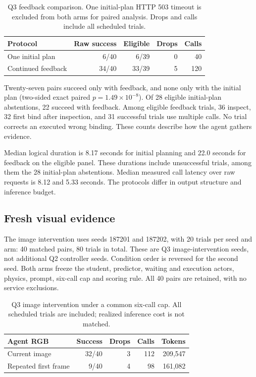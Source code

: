 \begin{table}[h]
\centering\small
\setlength{\tabcolsep}{3pt}
\begin{tabular}{lrrrr}
\toprule
Protocol & Raw success & Eligible & Drops & Calls\\
\midrule
One initial plan & 6/40 & 6/39 & 0 & 40\\
Continued feedback & 34/40 & 33/39 & 5 & 120\\
\bottomrule
\end{tabular}
\caption{Q3 feedback comparison. One initial-plan HTTP 503 timeout is excluded from both arms for paired analysis. Drops and calls include all scheduled trials.}
\label{tab:feedback-protocol-supp}
\end{table}

Twenty-seven pairs succeed only with feedback, and none only with the initial plan (two-sided exact paired $p=1.49\times10^{-8}$). Of 28 eligible initial-plan abstentions, 22 succeed with feedback. Among eligible feedback trials, 36 inspect, 32 first bind after inspection, and 31 successful trials use multiple calls. No trial corrects an executed wrong binding. These counts describe how the agent gathers evidence.

Median logical duration is 8.17 seconds for initial planning and 22.0 seconds for feedback on the eligible panel. These durations include unsuccessful trials, among them the 28 initial-plan abstentions. Median measured call latency over raw requests is 8.12 and 5.33 seconds. The protocols differ in output structure and inference budget.

\subsection{Fresh visual evidence}
\label{sec:fresh-evidence}
The image intervention uses seeds 187201 and 187202, with 20 trials per seed and arm: 40 matched pairs, 80 trials in total. These are Q3 image-intervention seeds, not additional Q2 controller seeds. Condition order is reversed for the second seed. Both arms freeze the student, predictor, waiting and execution actors, physics, prompt, six-call cap and scoring rule. All 40 pairs are retained, with no service exclusions.

\begin{table}[h]
\centering\small
\setlength{\tabcolsep}{3pt}
\begin{tabular}{lrrrr}
\toprule
Agent RGB & Success & Drops & Calls & Tokens\\
\midrule
Current image & 32/40 & 3 & 112 & 209,547\\
Repeated first frame & 9/40 & 4 & 98 & 161,082\\
\bottomrule
\end{tabular}
\caption{Q3 image intervention under a common six-call cap. All scheduled trials are included; realized inference cost is not matched.}
\label{tab:confirmation-image}
\end{table}


